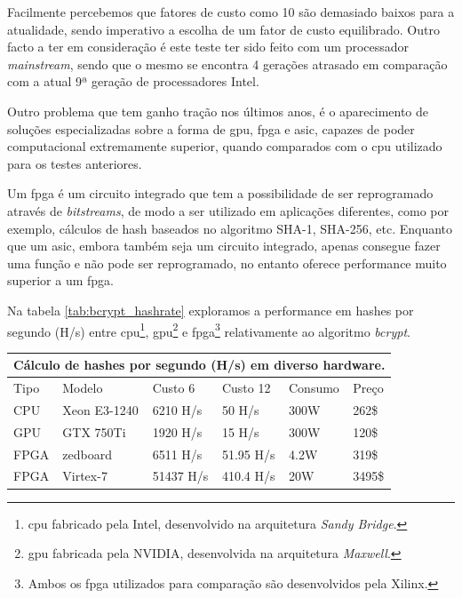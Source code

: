 Facilmente percebemos que fatores de custo como 10 são demasiado baixos para a atualidade, sendo imperativo a escolha de um fator de custo equilibrado. Outro facto a ter em consideração é este teste ter sido feito com um processador \emph{mainstream}, sendo que o mesmo se encontra 4 gerações atrasado em comparação com a atual 9ª geração de processadores Intel.

Outro problema que tem ganho tração nos últimos anos, é o aparecimento de soluções especializadas sobre a forma de \gls{gpu}, \gls{fpga}\cite{wiemer2014high}\cite{malvoni2014your} e \gls{asic}, capazes de poder computacional extremamente superior, quando comparados com o \gls{cpu} utilizado para os testes anteriores.

Um \gls{fpga} é um circuito integrado que tem a possibilidade de ser reprogramado através de \emph{bitstreams}, de modo a ser utilizado em aplicações diferentes, como por exemplo, cálculos de hash baseados no algoritmo SHA-1, SHA-256, etc. Enquanto que um \gls{asic}, embora também seja um circuito integrado, apenas consegue fazer uma função e não pode ser reprogramado, no entanto oferece performance muito superior a um \gls{fpga}.

Na tabela \ref{tab:bcrypt_hashrate} exploramos a performance em hashes por segundo (H/s) entre \gls{cpu}\footnote{\gls{cpu} fabricado pela Intel, desenvolvido na arquitetura \emph{Sandy Bridge}.}, \gls{gpu}\footnote{\gls{gpu} fabricada pela NVIDIA, desenvolvida na arquitetura \emph{Maxwell}.} e \gls{fpga}\footnote{Ambos os \gls{fpga} utilizados para comparação são desenvolvidos pela Xilinx.} relativamente ao algoritmo \emph{bcrypt}.

\begin{center}
    \begin{tabular}{ |p{1cm}|p{3.5cm}|p{2cm}|p{2cm}|p{1.75cm}|p{0.9cm}|  }
        \hline
        \multicolumn{6}{|c|}{Cálculo de hashes por segundo (H/s) em diverso hardware.} \\
        \hline
        Tipo & Modelo & Custo 6 & Custo 12 & Consumo & Preço\\
        \hline
        CPU & Xeon E3-1240 & 6210 H/s & 50 H/s& 300W & 262\$\\
        GPU & GTX 750Ti & 1920 H/s& 15 H/s& 300W & 120\$\\
        FPGA & zedboard & 6511 H/s & 51.95 H/s& 4.2W & 319\$\\
        FPGA & Virtex-7 & 51437 H/s& 410.4 H/s& 20W & 3495\$\\
        \hline
    \end{tabular}
\label{tab:bcrypt_hashrate} 
\end{center}

